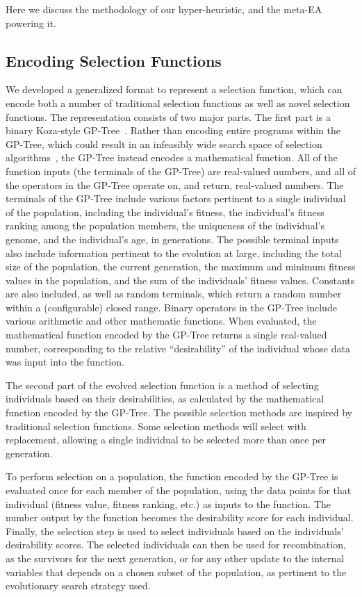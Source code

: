 \documentclass[sigconf]{acmart}
\begin{document}
Here we discuss the methodology of our hyper-heuristic, and the meta-EA powering it. 

\subsection{Encoding Selection Functions}
\label{Methodology-Encoding Selection Functions}

We developed a generalized format to represent a selection function, which can encode both a number of traditional selection functions as well as novel selection functions. The representation consists of two major parts. The first part is a binary Koza-style GP-Tree~\citep{koza1994genetic}. Rather than encoding entire programs within the GP-Tree, which could result in an infeasibly wide search space of selection algorithms~\citep{woodward2009GPNotGood}, the GP-Tree instead encodes a mathematical function. All of the function inputs (the terminals of the GP-Tree) are real-valued numbers, and all of the operators in the GP-Tree operate on, and return, real-valued numbers. The terminals of the GP-Tree include various factors pertinent to a single individual of the population, including the individual's fitness, the individual's fitness ranking among the population members, the uniqueness of the individual's genome, and the individual's age, in generations. The possible terminal inputs also include information pertinent to the evolution at large, including the total size of the population, the current generation, the maximum and minimum fitness values in the population, and the sum of the individuals' fitness values. Constants are also included, as well as random terminals, which return a random number within a (configurable) closed range. Binary operators in the GP-Tree include various arithmetic and other mathematic functions. When evaluated, the mathematical function encoded by the GP-Tree returns a single real-valued number, corresponding to the relative ``desirability'' of the individual whose data was input into the function. 

The second part of the evolved selection function is a method of selecting individuals based on their desirabilities, as calculated by the mathematical function encoded by the GP-Tree. The possible selection methods are inspired by traditional selection functions. Some selection methods will select with replacement, allowing a single individual to be selected more than once per generation. 

To perform selection on a population, the function encoded by the GP-Tree is evaluated once for each member of the population, using the data points for that individual (fitness value, fitness ranking, etc.) as inputs to the function. The number output by the function becomes the desirability score for each individual. Finally, the selection step is used to select individuals based on the individuals' desirability scores. The selected individuals can then be used for recombination, as the survivors for the next generation, or for any other update to the internal variables that depends on a chosen subset of the population, as pertinent to the evolutionary search strategy used.
\end{document}
